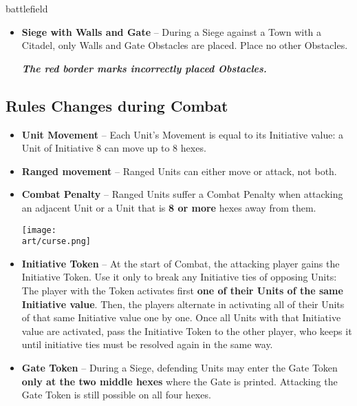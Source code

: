 \newpage
\begin{expansion}{battlefield}
  \begin{multicols*}{2}
  \begin{itemize}
    \item \textbf{Siege with Walls and Gate} – During a Siege against a Town with a Citadel, only Walls and Gate Obstacles are placed.
      Place no other Obstacles.

    {\footnotesize\textbf{\textit{\textcolor{darkcandyapplered}{The red border marks incorrectly placed Obstacles.}}}}
  \end{itemize}
  \subsection*{Rules Changes during Combat}
  \begin{itemize}
    \item \textbf{Unit Movement} – Each Unit's Movement is equal to its Initiative value: a Unit of Initiative 8 can move up to 8 hexes.
    \item \textbf{Ranged movement}  – Ranged  Units can either move or attack, not both.
    \item \textbf{Combat Penalty} – Ranged  Units suffer a Combat Penalty when attacking an adjacent Unit or a Unit that is \textbf{8 or more} hexes away from them.
    \begin{center}
      \vspace*{1em}
      \texttt{[image: \\art/curse.png]}
    \end{center}
    \columnbreak
    \item \textbf{Initiative Token} – At the start of Combat, the attacking player gains the Initiative Token.
    Use it only to break any Initiative ties of opposing Units:
    The player with the Token activates first \textbf{one of their Units of the same Initiative value}.
    Then, the players alternate in activating all of their Units of that same Initiative value one by one.
    Once all Units with that Initiative value are activated, pass the Initiative Token to the other player, who keeps it until initiative ties must be resolved again in the same way.
    \item \textbf{Gate Token} – During a Siege, defending Units may enter the Gate Token \textbf{only at the two middle hexes} where the Gate is printed.
    Attacking the Gate Token is still possible on all four hexes.


\end{itemize}
\end{multicols*}
\end{expansion}
